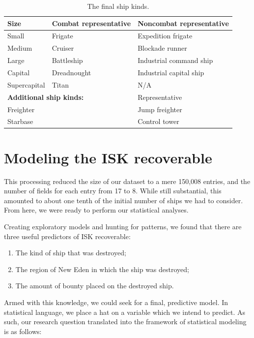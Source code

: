\documentclass[letterpaper,12pt,article]{memoir}
\begin{document}
\begin{table}[ht]
    \centering
    \begin{tabular}{@{}lll@{}}
        \toprule
        Size & Combat representative & Noncombat representative \\
        \midrule
        Small & Frigate & Expedition frigate \\
        Medium & Cruiser & Blockade runner \\
        Large & Battleship & Industrial command ship \\
        Capital & Dreadnought & Industrial capital ship \\
        Supercapital & Titan & N/A \\
        \midrule
        \multicolumn{2}{l}{\textbf{Additional ship kinds:}} & Representative \\
        \midrule
        \multicolumn{2}{l}{Freighter} & Jump freighter \\
        \multicolumn{2}{l}{Starbase} & Control tower \\
        \bottomrule
    \end{tabular}
    \caption{The final ship kinds.}
    \label{tab:shipkinds}
\end{table}

\clearpage
\chapter{Modeling the ISK recoverable}
\label{sec:stats}

This processing reduced the size of our dataset to a mere 150,008 entries, and the
number of fields for each entry from 17 to 8. While still substantial, this amounted
to about one tenth of the initial number of ships we had to consider. From here, we
were ready to perform our statistical analyses.

Creating exploratory models and hunting for patterns, we found that there are three
useful predictors of ISK recoverable: 
\begin{enumerate}[nolistsep,label=(\arabic*)]
    \item The kind of ship that was destroyed;
    \item The region of New Eden in which the ship was destroyed;
    \item The amount of bounty placed on the destroyed ship.
\end{enumerate}

Armed with this knowledge, we could seek for a final, predictive model. In
statistical language, we place a hat on a variable which we intend to predict. As
such, our research question translated into the framework of statistical modeling is
as follows:
\end{document}
